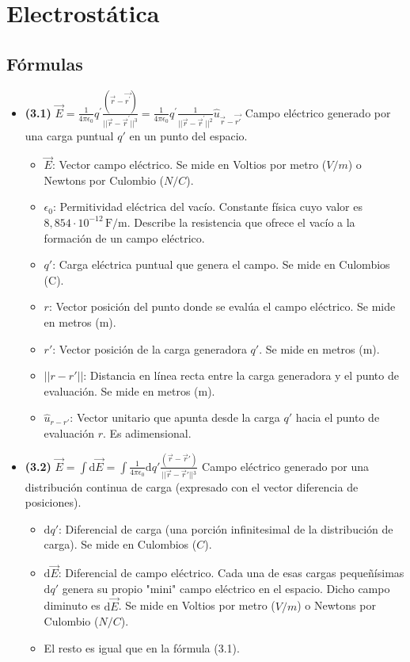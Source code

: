 \documentclass{article}
\begin{document}
	\section{Electrostática}
		\subsection*{Fórmulas}
			\begin{itemize}
				\item \textbf{(3.1)} $\boxed{\vec{E}=\frac{1}{4\pi\epsilon_{0}}q^{\prime}\frac{(\vec{r}-\vec{r^{\prime}})}{||\vec{r}-\vec{r}^{\prime}||^{3}} = \frac{1}{4\pi\epsilon_{0}}q^{\prime}\frac{1}{||\vec{r}-\vec{r}^{\prime}||^{2}}\hat{u}_{\vec{r}-\vec{r'}}}$ Campo eléctrico generado por una carga puntual $q'$ en un punto del espacio.
					\begin{itemize}
						\item $\vec{E}$: Vector campo eléctrico. Se mide en Voltios por metro ($V/m$) o Newtons por Culombio ($N/C$).
						\item $\epsilon_{0}$: Permitividad eléctrica del vacío. Constante física cuyo valor es $8,854\cdot10^{-12}\,\text{F/m}$. Describe la resistencia que ofrece el vacío a la formación de un campo eléctrico.
						\item $q'$: Carga eléctrica puntual que genera el campo. Se mide en Culombios (C).
						\item $r$: Vector posición del punto donde se evalúa el campo eléctrico. Se mide en metros (m).
						\item $r'$: Vector posición de la carga generadora $q'$. Se mide en metros (m).
						\item $||r -  r'||$: Distancia en línea recta entre la carga generadora y el punto de evaluación. Se mide en metros (m).
						\item $\hat{u}_{r -  r'}$: Vector unitario que apunta desde la carga $q'$ hacia el punto de evaluación $r$. Es adimensional.
					\end{itemize}

				\item \textbf{(3.2)} $\boxed{\vec{E} = \int \mathrm{d}\vec{E} = \int \frac{1}{4\pi\epsilon_{0}} \mathrm{d}q' \frac{(\vec{r} - \vec{r}')}{\vert{}\vert{}\vec{r} - \vec{r}'\vert{}\vert{}^3}}$ Campo eléctrico generado por una distribución continua de carga (expresado con el vector diferencia de posiciones).
					\begin{itemize}
						\item $\mathrm{d}q'$: Diferencial de carga (una porción infinitesimal de la distribución de carga). Se mide en Culombios ($C$).
						\item $\mathrm{d} \vec{E}$: Diferencial de campo eléctrico. Cada una de esas cargas pequeñísimas $\mathrm{d}q'$ genera su propio "mini" campo eléctrico en el espacio. Dicho campo diminuto es $\mathrm{d}\vec{E}$. Se mide en Voltios por metro ($V/m$) o Newtons por Culombio ($N/C$).
						\item El resto es igual que en la fórmula (3.1).
					\end{itemize}


\end{itemize}
\end{document}
